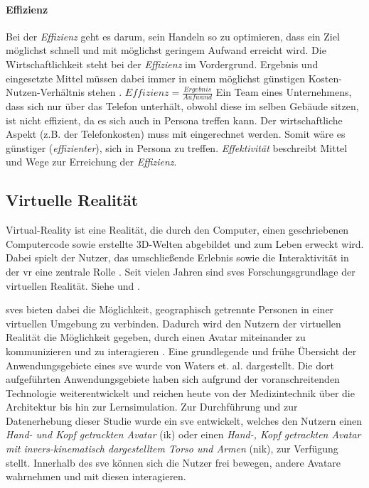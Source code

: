 \documentclass[a4paper,11pt]{article}%
\renewcommand{\\}{\vspace*{0.5\baselineskip} \newline}
\begin{document}
\paragraph{Effizienz}
Bei der \textit{Effizienz} geht es darum, sein Handeln so zu optimieren, dass ein Ziel möglichst schnell und mit möglichst geringem Aufwand erreicht wird. Die Wirtschaftlichkeit steht bei der \textit{Effizienz} im Vordergrund. Ergebnis und eingesetzte Mittel müssen dabei immer in einem möglichst günstigen Kosten-Nutzen-Verhältnis stehen \citep{eichhorn2005prinzip}.\\
$Effizienz = \frac{Ergebnis}{Aufwand}$\\
Ein Team eines Unternehmens, dass sich nur über das Telefon unterhält, obwohl diese im selben Gebäude sitzen, ist nicht effizient, da es sich auch in Persona treffen kann.
Der wirtschaftliche Aspekt (z.B. der Telefonkosten) muss mit eingerechnet werden. Somit wäre es günstiger (\textit{effizienter}), sich in Persona zu treffen.
\textit{Effektivität} beschreibt Mittel und Wege zur Erreichung der \textit{Effizienz}.
\newpage
	\subsection{Virtuelle Realität}
	\label{Virtual Reality}
Virtual-Reality ist eine Realität, die durch den Computer, einen geschriebenen Computercode sowie erstellte 3D-Welten abgebildet und zum Leben erweckt wird. Dabei spielt der Nutzer, das umschließende Erlebnis sowie die Interaktivität in der \ac{vr} eine zentrale Rolle \citep[S. 6-12]{sherman2018understanding}.
Seit vielen Jahren sind \ac{sve}s Forschungsgrundlage der virtuellen Realität. Siehe \citep{shuffler2011there} \citep{steed1999leadership} und \citep{de2011level}.

	\ac{sve}s bieten dabei die Möglichkeit, geographisch getrennte Personen in einer virtuellen Umgebung zu verbinden. Dadurch wird den Nutzern der virtuellen Realität die Möglichkeit gegeben, durch einen Avatar miteinander zu kommunizieren und zu interagieren \citep[S. 1-3]{pettifer1999designing}. Eine grundlegende und frühe Übersicht der Anwendungsgebiete eines \ac{sve} wurde von Waters et. al. \citep{waters1997rise} dargestellt. Die dort aufgeführten Anwendungsgebiete haben sich aufgrund der voranschreitenden Technologie weiterentwickelt und reichen heute von der Medizintechnik über die Architektur bis hin zur Lernsimulation.
Zur Durchführung und zur Datenerhebung dieser Studie wurde ein \ac{sve} entwickelt, welches den Nutzern einen \textit{Hand- und Kopf getrackten Avatar} (\ac{ik}) oder einen \textit{Hand-, Kopf getrackten Avatar mit invers-kinematisch dargestelltem Torso und Armen} (\ac{nik}), zur Verfügung stellt. Innerhalb des \ac{sve} können sich die Nutzer frei bewegen, andere Avatare wahrnehmen und mit diesen interagieren.
	
\end{document}
